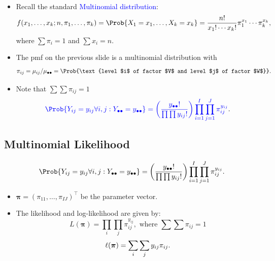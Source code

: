 \documentclass{article}\usepackage[]{graphicx}\usepackage[svgnames]{xcolor}
\providecommand\given{} %
\renewcommand\given{\nonscript\:\delimsize\vert\nonscript\:\mathopen{}}%
\renewcommand\given{\nonscript\:\delimsize\vert\nonscript\:\mathopen{}}%
\renewcommand\given{\nonscript\:\delimsize\vert\nonscript\:\mathopen{}}%
\renewcommand\given{\nonscript\:\delimsize\vert\nonscript\:\mathopen{}}%
\renewcommand\given{\nonscript\:\delimsize\vert\nonscript\:\mathopen{}}%
\renewcommand\given{\nonscript\:\delimsize\vert\nonscript\:\mathopen{}}%
\renewcommand\given{\nonscript\:\delimsize\vert\nonscript\:\mathopen{}}%
\renewcommand\given{\nonscript\:\delimsize\vert\nonscript\:\mathopen{}}%
\let\log\relax%
\renewcommand\given{:}
\providecommand{\Vector}[1]{\bm{#1}}%
\begin{document}
\begin{itemize}
\begin{align*}
            \end{align*}
      \item Recall the standard \textcolor{Blue}{Multinomial distribution}:
            \[ f(x_1,\ldots,x_k;n,\pi_1,\ldots,\pi_k)=\Prob{X_1=x_1,\ldots,X_k=x_k}=\frac{n!}{x_1!\cdots x_k!}\pi_1^{x_1}\cdots \pi_k^{x_k}, \]
            where $ \sum \pi_i=1 $ and $ \sum x_i=n $.
      \item The pmf on the previous slide is a multinomial distribution with
            \[ \pi_{ij}=\mu_{ij}/\mu_{\bullet\bullet}=\Prob{\text{level $i$ of factor $V$ and level $j$ of factor $W$}}. \]
      \item Note that $\sum\sum \pi_{ij}=1$
            \[ \textcolor{Blue}{\Prob{Y_{ij}=y_{ij}\forall i,j\given Y_{\bullet\bullet}=y_{\bullet\bullet}}
                  =\biggl(\frac{y_{\bullet\bullet}!}{\prod\prod y_{ij}!}\biggr)\prod_{i=1}^I \prod_{j=1}^J \pi_{ij}^{y_{ij}}}. \]
\end{itemize}
\subsection*{Multinomial Likelihood}
\[ \Prob{Y_{ij}=y_{ij}\forall i,j\given Y_{\bullet\bullet}=y_{\bullet\bullet}}
      =\biggl(\frac{y_{\bullet\bullet}!}{\prod\prod y_{ij}!}\biggr)\prod_{i=1}^I \prod_{j=1}^J \pi_{ij}^{y_{ij}}. \]
\begin{itemize}
      \item $ \Vector{\pi}=(\pi_{11},\ldots,\pi_{IJ})^\top $ be the parameter vector.
      \item The likelihood and log-likelihood are given by:
            \[ L(\Vector{\pi})=\prod_i\prod_j \pi_{ij}^{y_{ij}},\text{ where }\sum\sum \pi_{ij}=1 \]
            \[ \ell(\Vector{\pi})=\sum_i\sum_j y_{ij}\log{\pi_{ij}}. \]
\end{itemize}
\end{document}
